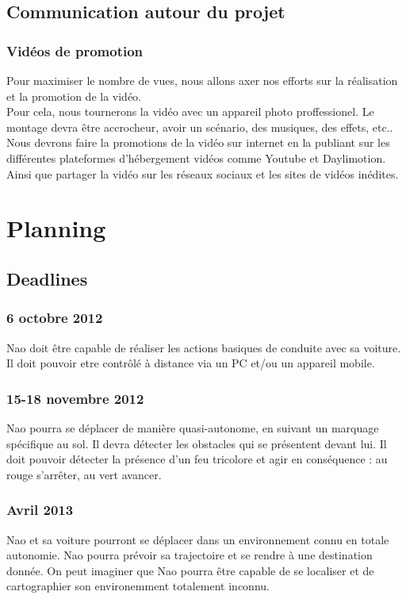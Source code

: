 \documentclass[11pt]{report} %
\begin{document}
	\section{Communication autour du projet}
		\subsection{Vidéos de promotion}
			Pour maximiser le nombre de vues, nous allons axer nos efforts sur la réalisation et la promotion de la vidéo.\\
			Pour cela, nous tournerons la vidéo avec un appareil photo proffessionel. Le montage devra être accrocheur, avoir un scénario, des musiques, des effets, etc..\\
			Nous devrons faire la promotions de la vidéo sur internet en la publiant sur les différentes plateformes d'hébergement vidéos comme Youtube et Daylimotion. Ainsi que partager la vidéo sur les réseaux sociaux et les sites de vidéos inédites.
\chapter{Planning}
	\section{Deadlines}
		\subsection{6 octobre 2012}
			Nao doit être capable de réaliser les actions basiques de conduite avec sa voiture.\\
			Il doit pouvoir etre contrôlé à distance via un PC et/ou un appareil mobile.
		\subsection{15-18 novembre 2012}
			Nao pourra se déplacer de manière quasi-autonome, en suivant un marquage spécifique au sol.
			Il devra détecter les obstacles qui se présentent devant lui.
			Il doit pouvoir détecter la présence d'un feu tricolore et agir en conséquence : au rouge s'arrêter, au vert avancer.
		\subsection{Avril 2013}
			Nao et sa voiture pourront se déplacer dans un environnement connu en totale autonomie.
			Nao pourra prévoir sa trajectoire et se rendre à une destination donnée.
			On peut imaginer que Nao pourra être capable de se localiser et de cartographier son environemment totalement inconnu.
\end{document}
